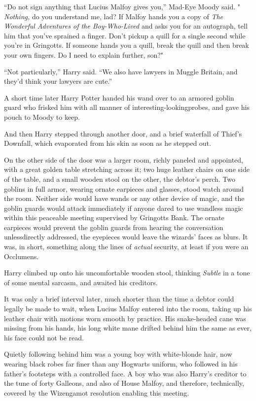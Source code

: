 ``Do not sign anything that Lucius Malfoy gives you,'' Mad-Eye Moody said. " \emph{Nothing,} do you understand me, lad? If Malfoy hands you a copy of \emph{The Wonderful Adventures of the Boy-Who-Lived} and asks you for an autograph, tell him that you've sprained a finger. Don't pickup a quill for a single second while you're in Gringotts. If someone hands you a quill, break the quill and then break your own fingers. Do I need to explain further, son?"

``Not particularly,'' Harry said. ``We also have lawyers in Muggle Britain, and they'd think your lawyers are cute.''

A short time later Harry Potter handed his wand over to an armored goblin guard who frisked him with all manner of interesting-lookingprobes, and gave his pouch to Moody to keep.

And then Harry stepped through another door, and a brief waterfall of Thief's Downfall, which evaporated from his skin as soon as he stepped out.

On the other side of the door was a larger room, richly paneled and appointed, with a great golden table stretching across it; two huge leather chairs on one side of the table, and a small wooden stool on the other, the debtor's perch. Two goblins in full armor, wearing ornate earpieces and glasses, stood watch around the room. Neither side would have wands or any other device of magic, and the goblin guards would attack immediately if anyone dared to use wandless magic within this peaceable meeting supervised by Gringotts Bank. The ornate earpieces would prevent the goblin guards from hearing the conversation unlessdirectly addressed, the eyepieces would leave the wizards' faces as blurs. It was, in short, something along the lines of \emph{actual} security, at least if you were an Occlumens.

Harry climbed up onto his uncomfortable wooden stool, thinking \emph{Subtle} in a tone of some mental sarcasm, and awaited his creditors.

It was only a brief interval later, much shorter than the time a debtor could legally be made to wait, when Lucius Malfoy entered into the room, taking up his leather chair with motions worn smooth by practice. His snake-headed cane was missing from his hands, his long white mane drifted behind him the same as ever, his face could not be read.

Quietly following behind him was a young boy with white-blonde hair, now wearing black robes far finer than any Hogwarts uniform, who followed in his father's footsteps with a controlled face. A boy who was also Harry's creditor to the tune of forty Galleons, and also of House Malfoy, and therefore, technically, covered by the Wizengamot resolution enabling this meeting.


